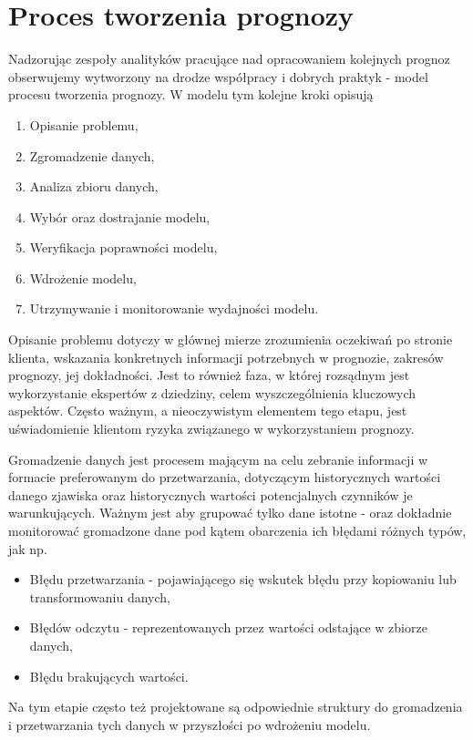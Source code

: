 \documentclass[10pt,a4paper]{book}
\begin{document}
\section{Proces tworzenia prognozy}

Nadzorując zespoły analityków pracujące nad opracowaniem kolejnych prognoz obserwujemy wytworzony na drodze współpracy i dobrych praktyk - model procesu tworzenia prognozy. W modelu tym kolejne kroki opisują \citep[Sec. 1.3]{montgomery2015introduction}

\begin{enumerate}
\item Opisanie problemu,
\item Zgromadzenie danych,
\item Analiza zbioru danych,
\item Wybór oraz dostrajanie modelu,
\item Weryfikacja poprawności modelu,
\item Wdrożenie modelu,
\item Utrzymywanie i monitorowanie wydajności modelu.
\end{enumerate}

Opisanie problemu dotyczy w głównej mierze zrozumienia oczekiwań po stronie klienta, wskazania konkretnych informacji potrzebnych w prognozie, zakresów prognozy, jej dokładności. Jest to również faza, w której rozsądnym jest wykorzystanie ekspertów z dziedziny, celem wyszczególnienia kluczowych aspektów. Często ważnym, a nieoczywistym elementem tego etapu, jest uświadomienie klientom ryzyka związanego w wykorzystaniem prognozy.

Gromadzenie danych jest procesem mającym na celu zebranie informacji w formacie preferowanym do przetwarzania, dotyczącym historycznych wartości danego zjawiska oraz historycznych wartości potencjalnych czynników je warunkujących. Ważnym jest aby grupować tylko dane istotne - oraz dokładnie monitorować gromadzone dane pod kątem obarczenia ich błędami różnych typów, jak np.
\begin{itemize}
\item Błędu przetwarzania - pojawiającego się wskutek błędu przy kopiowaniu lub transformowaniu danych,
\item Błędów odczytu - reprezentowanych przez wartości odstające w zbiorze danych, 
\item Błędu brakujących wartości. 
\end{itemize}
Na tym etapie często też projektowane są odpowiednie struktury do gromadzenia i przetwarzania tych danych w przyszłości po wdrożeniu modelu.
\end{document}
